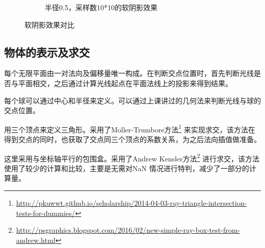 \begin{figure}
\begin{subfigure}{0.45\textwidth}
        \caption{半径0.5，采样数10*10的软阴影效果}
    \end{subfigure}
    \caption{软阴影效果对比}
    \label{fig:soft}
\end{figure}

\subsection {物体的表示及求交}
\begin{description}[align=left,labelwidth=1.5cm]
\item[无限平面] 每个无限平面由一对法向及偏移量唯一构成。在判断交点位置时，首先判断光线是否与平面相交，之后通过计算光线起点在平面法线上的投影来得到结果。
\item[球] 每个球可以通过中心和半径来定义。可以通过上课讲过的几何法来判断光线与球的交点位置。
\item[三角形] 用三个顶点来定义三角形。采用了Moller-Trumbore方法\footnote{\url{http://pkuwwt.github.io/scholarship/2014-04-03-ray-triangle-intersection-tests-for-dummies/}} 来实现求交，该方法在得到交点的同时，也获取了交点同三个顶点的系数关系，为之后法向插值做准备。
\item[包围盒] 这里采用与坐标轴平行的包围盒。采用了Andrew Kensler方法\footnote{\url{http://psgraphics.blogspot.com/2016/02/new-simple-ray-box-test-from-andrew.html}} 进行求交，该方法使用了较少的计算和比较，主要是无需对NaN 情况进行特判，减少了一部分的计算量。
\end{description}

